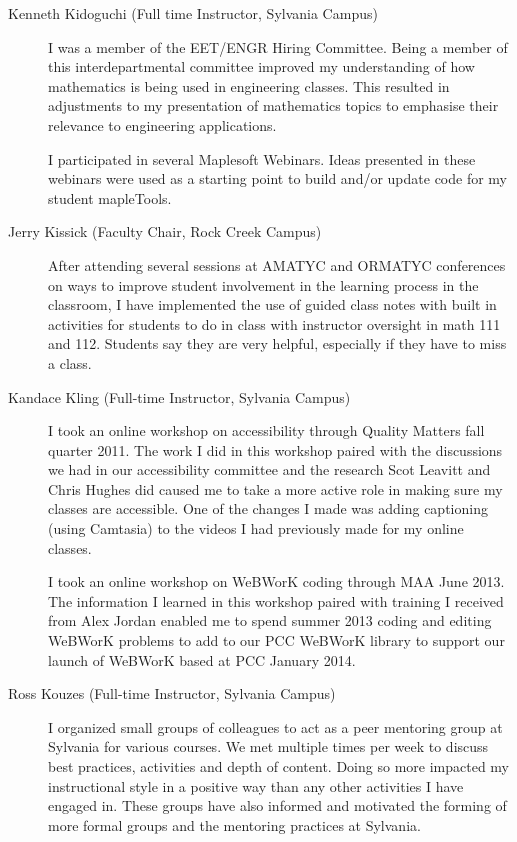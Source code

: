 \begin{description}
	\item[Kenneth Kidoguchi (Full time Instructor, Sylvania Campus)]
	I was a member of the EET/ENGR Hiring Committee.  Being a member of this
	interdepartmental committee improved my understanding of how mathematics is
	being used in engineering classes.  This resulted in adjustments to my
	presentation of mathematics topics to emphasise their relevance to engineering
	applications.

	I participated in several Maplesoft Webinars.  Ideas presented in these
	webinars were used as a starting point to build and/or update code for my
	student mapleTools.

	\item[Jerry Kissick (Faculty Chair, Rock Creek Campus)]
	After attending several sessions at AMATYC and ORMATYC conferences on ways to
	improve student involvement in the learning process in the classroom, I have
	implemented the use of guided class notes with built in activities for students
	to do in class with instructor oversight in math 111 and 112. Students say they
	are very helpful, especially if they have to miss a class.

	\item[Kandace Kling (Full-time Instructor, Sylvania Campus)]
	I took an online workshop on accessibility through Quality Matters fall quarter
	2011. The work I did in this workshop paired with the discussions we had in our
	accessibility committee and the research Scot Leavitt and Chris Hughes did
	caused me to take a more active role in making sure my classes are accessible.
	One of the changes I made was adding captioning (using Camtasia) to the videos
	I had previously made for my online classes.

	I took an online workshop on WeBWorK coding through MAA June 2013. The
	information I learned in this workshop paired with training I received from
	Alex Jordan enabled me to spend summer 2013 coding and editing WeBWorK problems
	to add to our PCC WeBWorK library to support our launch of WeBWorK based at PCC
	January 2014.

	\item[Ross Kouzes (Full-time Instructor, Sylvania Campus)]
	I organized small groups of colleagues to act as a peer mentoring group at
	Sylvania for various courses. We met multiple times per week to discuss best
	practices, activities and depth of content. Doing so more impacted my
	instructional style in a positive way than any other activities I have engaged
	in. These groups have also informed and motivated the forming of more formal
	groups and the mentoring practices at Sylvania.


\end{description}
